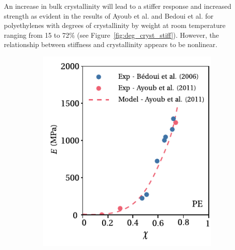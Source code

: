 An increase in bulk crystallinity will lead to a stiffer response and increased strength as evident in the results of Ayoub et al. \citep{ayoubEffectsCrystalContent2011} and Bedoui et al. \citep{bedouiMicromechanicalModelingIsotropic2006} for polyethylenes with degrees of crystallinity by weight at room temperature ranging from 15 to 72\% (see Figure~\ref{fig:deg_cryst_stiff}).
However, the relationship between stiffness and crystallinity appears to be nonlinear.
\begin{figure}[hbtp]
	\centering
	\begin{subfigure}[b]{0.45\textwidth}
							\centering
							\includegraphics[width=\textwidth]{figures/deg_cryst_stiff}
							\caption{}
							\label{subfig:deg_cryst_stiff}
			\end{subfigure} \hfill
			\begin{subfigure}[b]{0.45\textwidth}
							\centering

\end{subfigure}
\end{figure}
